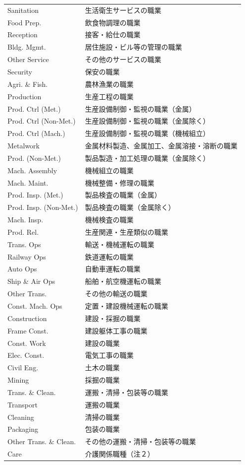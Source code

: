 \documentclass[12pt]{article}
\begin{document}
\begin{table}[!htbp]
\begin{center}
\begin{tabular}[t]{ll}
Sanitation & 生活衛生サービスの職業\\
Food Prep. & 飲食物調理の職業\\
Reception & 接客・給仕の職業\\
Bldg. Mgmt. & 居住施設・ビル等の管理の職業\\
Other Service & その他のサービスの職業\\
Security & 保安の職業\\
Agri. \& Fish. & 農林漁業の職業\\
Production & 生産工程の職業\\
Prod. Ctrl (Met.) & 生産設備制御・監視の職業（金属）\\
Prod. Ctrl (Non-Met.) & 生産設備制御・監視の職業（金属除く）\\
Prod. Ctrl (Mach.) & 生産設備制御・監視の職業（機械組立）\\
Metalwork & 金属材料製造、金属加工、金属溶接・溶断の職業\\
Prod. (Non-Met.) & 製品製造・加工処理の職業（金属除く）\\
Mach. Assembly & 機械組立の職業\\
Mach. Maint. & 機械整備・修理の職業\\
Prod. Insp. (Met.) & 製品検査の職業（金属）\\
Prod. Insp. (Non-Met.) & 製品検査の職業（金属除く）\\
Mach. Insp. & 機械検査の職業\\
Prod. Rel. & 生産関連・生産類似の職業\\
Trans. Ops & 輸送・機械運転の職業\\
Railway Ops & 鉄道運転の職業\\
Auto Ops & 自動車運転の職業\\
Ship \& Air Ops & 船舶・航空機運転の職業\\
Other Trans. & その他の輸送の職業\\
Const. Mach. Ops & 定置・建設機械運転の職業\\
Construction & 建設・採掘の職業\\
Frame Const. & 建設躯体工事の職業\\
Const. Work & 建設の職業\\
Elec. Const. & 電気工事の職業\\
Civil Eng. & 土木の職業\\
Mining & 採掘の職業\\
Trans. \& Clean. & 運搬・清掃・包装等の職業\\
Transport & 運搬の職業\\
Cleaning & 清掃の職業\\
Packaging & 包装の職業\\
Other Trans. \& Clean. & その他の運搬・清掃・包装等の職業\\
Care & 介護関係職種（注２）\\
\bottomrule
\end{tabular}
  \end{center}\footnotesize
\end{table} 
\end{document}
